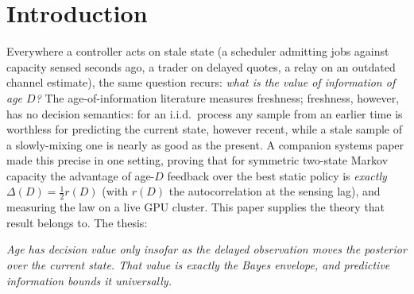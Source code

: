 \documentclass[acmsmall,screen,review,anonymous]{acmart}
\begin{document}
\section{Introduction}\label{sec:intro}

Everywhere a controller acts on stale state (a scheduler admitting jobs
against capacity sensed seconds ago, a trader on delayed quotes, a relay on
an outdated channel estimate), the same question recurs: \emph{what is the
value of information of age $D$?} The age-of-information literature
\cite{yates21} measures freshness; freshness, however, has no decision
semantics: for an i.i.d.\ process any sample from an earlier time is
worthless for predicting the current state, however recent, while a stale
sample of a slowly-mixing one is nearly as good as the present. A
companion systems paper \cite{infocom} made this precise in one setting,
proving that for symmetric two-state Markov capacity the advantage of
age-$D$ feedback over the best static policy is \emph{exactly}
$\Delta(D)=\tfrac12 r(D)$ (with $r(D)$ the autocorrelation at the sensing lag), and
measuring the law on a live GPU cluster. This paper supplies the theory that
result belongs to. The thesis:
\begin{center}\emph{Age has decision value only insofar as the delayed
observation moves the posterior over the current state. That value is
exactly the Bayes envelope, and predictive information bounds it
universally.}\end{center}
\end{document}
